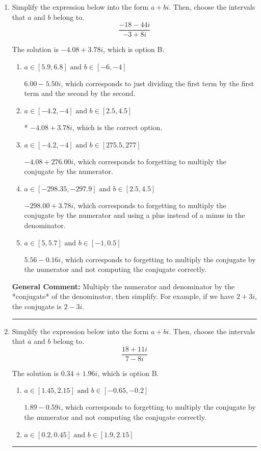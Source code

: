 \documentclass{extbook}[14pt]
\newcommand{\litem}[1]{\item #1

\rule{\textwidth}{0.4pt}}
\begin{document}
\begin{enumerate}\litem{
Simplify the expression below into the form $a+bi$. Then, choose the intervals that $a$ and $b$ belong to.
\[ \frac{-18 - 44 i}{-3 + 8 i} \]

The solution is \( -4.08  + 3.78 i \), which is option B.\begin{enumerate}[label=\Alph*.]
\item \( a \in [5.9, 6.8] \text{ and } b \in [-6, -4] \)

 $6.00  - 5.50 i$, which corresponds to just dividing the first term by the first term and the second by the second.
\item \( a \in [-4.2, -4] \text{ and } b \in [2.5, 4.5] \)

* $-4.08  + 3.78 i$, which is the correct option.
\item \( a \in [-4.2, -4] \text{ and } b \in [275.5, 277] \)

 $-4.08  + 276.00 i$, which corresponds to forgetting to multiply the conjugate by the numerator.
\item \( a \in [-298.35, -297.9] \text{ and } b \in [2.5, 4.5] \)

 $-298.00  + 3.78 i$, which corresponds to forgetting to multiply the conjugate by the numerator and using a plus instead of a minus in the denominator.
\item \( a \in [5, 5.7] \text{ and } b \in [-1, 0.5] \)

 $5.56  - 0.16 i$, which corresponds to forgetting to multiply the conjugate by the numerator and not computing the conjugate correctly.
\end{enumerate}

\textbf{General Comment:} Multiply the numerator and denominator by the *conjugate* of the denominator, then simplify. For example, if we have $2+3i$, the conjugate is $2-3i$.
}
\litem{
Simplify the expression below into the form $a+bi$. Then, choose the intervals that $a$ and $b$ belong to.
\[ \frac{18 + 11 i}{7 - 8 i} \]

The solution is \( 0.34  + 1.96 i \), which is option B.\begin{enumerate}[label=\Alph*.]
\item \( a \in [1.45, 2.15] \text{ and } b \in [-0.65, -0.2] \)

 $1.89  - 0.59 i$, which corresponds to forgetting to multiply the conjugate by the numerator and not computing the conjugate correctly.
\item \( a \in [0.2, 0.45] \text{ and } b \in [1.9, 2.15] \)


\end{enumerate}}
\end{enumerate}
\end{document}
